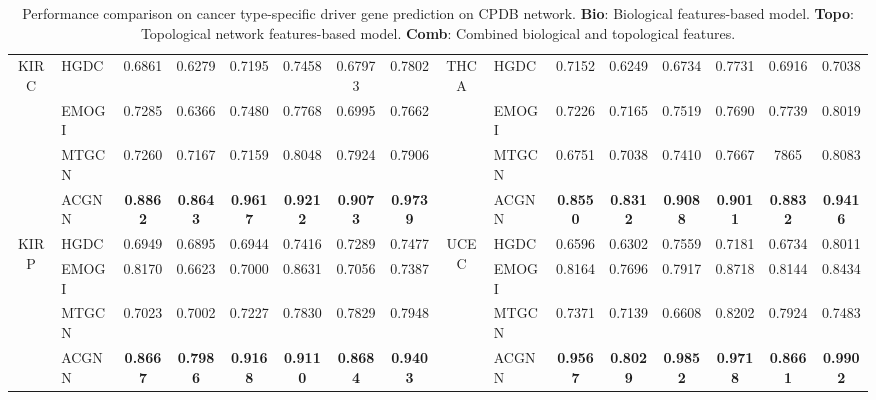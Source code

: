 \begin{table*}[h]
\begin{tabular}{c l ccc ccc  c l ccc ccc}
		\midrule
		\multirow{4}{*}{KIRC} & HGDC & 0.6861 & 0.6279 & 0.7195 & 0.7458 & 0.67973 & 0.7802  & 
		\multirow{4}{*}{THCA} & HGDC & 0.7152 & 0.6249 & 0.6734 & 0.7731 & 0.6916 & 0.7038 \\
		& EMOGI & 0.7285 & 0.6366 & 0.7480 & 0.7768 & 0.6995 & 0.7662 & 
		& EMOGI & 0.7226 & 0.7165 & 0.7519 & 0.7690 & 0.7739 & 0.8019 \\
		& MTGCN & 0.7260 & 0.7167 & 0.7159 & 0.8048 & 0.7924 & 0.7906  & 
		& MTGCN & 0.6751 & 0.7038 & 0.7410 & 0.7667 & 7865& 0.8083 \\
		& ACGNN  & \textbf{0.8862}  & \textbf{0.8643}  & \textbf{0.9617}  & \textbf{0.9212}  & \textbf{0.9073}  & \textbf{0.9739} & 
		& ACGNN  & \textbf{0.8550}  & \textbf{0.8312}  & \textbf{0.9088}  & \textbf{0.9011}  & \textbf{0.8832}  & \textbf{0.9416}  \\
		\midrule
		\multirow{4}{*}{KIRP} & HGDC & 0.6949 & 0.6895 & 0.6944 & 0.7416 & 0.7289 & 0.7477  & 
		\multirow{4}{*}{UCEC} & HGDC & 0.6596 & 0.6302 & 0.7559 & 0.7181 & 0.6734 & 0.8011 \\
		& EMOGI & 0.8170 & 0.6623 & 0.7000 & 0.8631 & 0.7056 & 0.7387  & 
		& EMOGI & 0.8164 & 0.7696 & 0.7917 & 0.8718 & 0.8144 & 0.8434 \\
		& MTGCN & 0.7023 & 0.7002 & 0.7227 & 0.7830 & 0.7829 & 0.7948  & 
		& MTGCN & 0.7371 & 0.7139 & 0.6608 & 0.8202 & 0.7924 & 0.7483 \\
		& ACGNN  & \textbf{0.8667}  & \textbf{0.7986}  & \textbf{0.9168}  & \textbf{0.9110}  & \textbf{0.8684}  & \textbf{0.9403}  & 
		& ACGNN & \textbf{0.9567} & \textbf{0.8029} & \textbf{0.9852} & \textbf{0.9718} & \textbf{0.8661} & \textbf{0.9902} \\
		
		\bottomrule
	\end{tabular}
	\caption{Performance comparison on cancer type-specific driver gene prediction on CPDB network. 
		\textbf{Bio}: Biological features-based model. 
		\textbf{Topo}: Topological network features-based model. 
		\textbf{Comb}: Combined biological and topological features.}
	\label{tab:cancer_results}
\end{table*}


 
